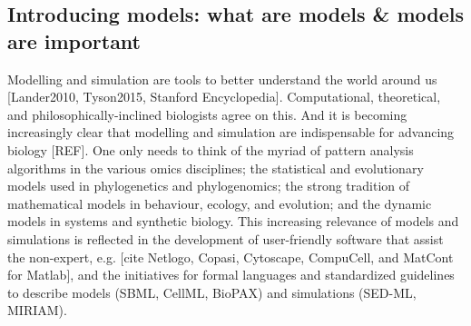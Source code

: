 \subsection{Introducing models: what are models \& models are important}

Modelling and simulation are tools to better understand the world around us [Lander2010, Tyson2015, Stanford Encyclopedia]. Computational, theoretical, and philosophically-inclined biologists agree on this. And it is becoming increasingly clear that modelling and simulation are indispensable for advancing biology [REF]. One only needs to think of the myriad of pattern analysis algorithms in the various omics disciplines; the statistical and evolutionary models used in phylogenetics and phylogenomics; the strong tradition of mathematical models in behaviour, ecology, and evolution; and the dynamic models in systems and synthetic biology. This increasing relevance of models and simulations is reflected in the development of user-friendly software that assist the non-expert, e.g. [cite Netlogo, Copasi, Cytoscape, CompuCell, and MatCont for Matlab], and the initiatives for formal languages and standardized guidelines to describe models (SBML, CellML, BioPAX) and simulations (SED-ML, MIRIAM).
